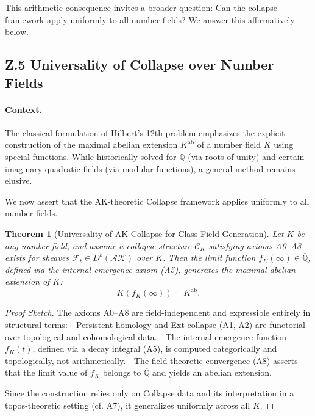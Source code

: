 \documentclass[11pt]{article}
\newtheorem{theorem}{Theorem}[section]
\begin{document}
This arithmetic consequence invites a broader question:  
Can the collapse framework apply uniformly to all number fields?  
We answer this affirmatively below.


\subsection*{Z.5 Universality of Collapse over Number Fields}

\paragraph{Context.}
The classical formulation of Hilbert's 12th problem emphasizes the explicit construction of the maximal abelian extension \( K^{\mathrm{ab}} \) of a number field \( K \) using special functions.  
While historically solved for \( \mathbb{Q} \) (via roots of unity) and certain imaginary quadratic fields (via modular functions), a general method remains elusive.

We now assert that the AK-theoretic Collapse framework applies uniformly to all number fields.

\begin{theorem}[Universality of AK Collapse for Class Field Generation]
Let \( K \) be any number field, and assume a collapse structure \( \mathcal{C}_K \) satisfying axioms A0–A8 exists for sheaves \( \mathcal{F}_t \in D^b(\mathcal{AK}) \) over \( K \).  
Then the limit function \( f_K(\infty) \in \overline{\mathbb{Q}} \), defined via the internal emergence axiom (A5),  
generates the maximal abelian extension of \( K \):
\[
K(f_K(\infty)) = K^{\mathrm{ab}}.
\]
\end{theorem}

\begin{proof}[Proof Sketch]
The axioms A0–A8 are field-independent and expressible entirely in structural terms:  
- Persistent homology and Ext collapse (A1, A2) are functorial over topological and cohomological data.
- The internal emergence function \( f_K(t) \), defined via a decay integral (A5), is computed categorically and topologically, not arithmetically.
- The field-theoretic convergence (A8) asserts that the limit value of \( f_K \) belongs to \( \overline{\mathbb{Q}} \) and yields an abelian extension.

Since the construction relies only on Collapse data and its interpretation in a topos-theoretic setting (cf. A7), it generalizes uniformly across all \( K \).
\end{proof}
\end{document}
